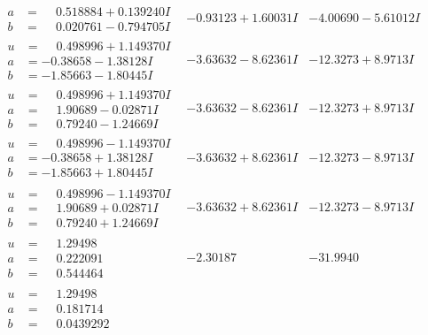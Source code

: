 \documentclass[1p]{elsarticle_modified}
\theoremstyle{definition}
\begin{document}
$$\begin{array}{c|c|c}
\begin{aligned}
a &= \phantom{-}0.518884 + 0.139240 I \\
b &= \phantom{-}0.020761 - 0.794705 I\end{aligned}
 & -0.93123 + 1.60031 I & -4.00690 - 5.61012 I \\ \hline\begin{aligned}
u &= \phantom{-}0.498996 + 1.149370 I \\
a &= -0.38658 - 1.38128 I \\
b &= -1.85663 - 1.80445 I\end{aligned}
 & -3.63632 - 8.62361 I & -12.3273 + 8.9713 I \\ \hline\begin{aligned}
u &= \phantom{-}0.498996 + 1.149370 I \\
a &= \phantom{-}1.90689 - 0.02871 I \\
b &= \phantom{-}0.79240 - 1.24669 I\end{aligned}
 & -3.63632 - 8.62361 I & -12.3273 + 8.9713 I \\ \hline\begin{aligned}
u &= \phantom{-}0.498996 - 1.149370 I \\
a &= -0.38658 + 1.38128 I \\
b &= -1.85663 + 1.80445 I\end{aligned}
 & -3.63632 + 8.62361 I & -12.3273 - 8.9713 I \\ \hline\begin{aligned}
u &= \phantom{-}0.498996 - 1.149370 I \\
a &= \phantom{-}1.90689 + 0.02871 I \\
b &= \phantom{-}0.79240 + 1.24669 I\end{aligned}
 & -3.63632 + 8.62361 I & -12.3273 - 8.9713 I \\ \hline\begin{aligned}
u &= \phantom{-}1.29498\phantom{ +0.000000I} \\
a &= \phantom{-}0.222091\phantom{ +0.000000I} \\
b &= \phantom{-}0.544464\phantom{ +0.000000I}\end{aligned}
 & -2.30187\phantom{ +0.000000I} & -31.9940\phantom{ +0.000000I} \\ \hline\begin{aligned}
u &= \phantom{-}1.29498\phantom{ +0.000000I} \\
a &= \phantom{-}0.181714\phantom{ +0.000000I} \\
b &= \phantom{-}0.0439292\phantom{ +0.000000I}\end{aligned}

\end{array}$$
\end{document}
